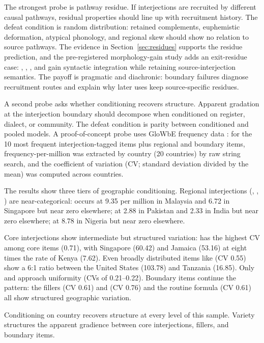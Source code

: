 \documentclass[12pt]{article}
\begin{document}
The strongest probe is pathway residue. If interjections are recruited by
different causal pathways, residual properties should line up with
recruitment history. The defeat condition is random distribution:
retained complements, euphemistic deformation, atypical phonology, and
regional skew should show no relation to source pathways. The evidence
in Section~\ref{sec:residues} supports the residue prediction, and the
pre-registered morphology-gain study adds an exit-residue case:
, , , and 
gain syntactic integration while retaining source-interjection semantics.
The payoff is pragmatic and diachronic: boundary failures diagnose
recruitment routes and explain why later uses keep source-specific
residues.

A second probe asks whether conditioning recovers structure. Apparent
gradation at the interjection boundary should decompose when conditioned
on register, dialect, or community. The defeat condition is parity
between conditioned and pooled models. A proof-of-concept probe uses
GloWbE frequency data \citep{daviesfuchs2015}: for the 10 most frequent
interjection-tagged items plus regional and boundary items,
frequency-per-million was extracted by country (20 countries) by raw
string search, and the coefficient of variation (CV; standard deviation
divided by the mean) was computed across countries.

The results show three tiers of geographic conditioning. Regional
interjections (, , ) are
near-categorical:  occurs at 9.35 per million in Malaysia
and 6.72 in Singapore but near zero elsewhere;  at 2.88
in Pakistan and 2.33 in India but near zero elsewhere; 
at 8.78 in Nigeria but near zero elsewhere.

Core interjections show
intermediate but structured variation:  has the highest
CV among core items (0.71), with Singapore (60.42) and Jamaica (53.16)
at eight times the rate of Kenya (7.62). Even broadly distributed items
like  (CV 0.55) show a 6:1 ratio between the United
States (103.78) and Tanzania (16.85). Only  and
 approach uniformity (CVs of 0.21--0.22). Boundary items
continue the pattern: the fillers  (CV 0.61) and
 (CV 0.76) and the routine formula  (CV 0.61)
all show structured geographic variation.

Conditioning on country recovers structure at every level of this
sample. Variety structures the apparent gradience between core
interjections, fillers, and boundary items.
\end{document}
